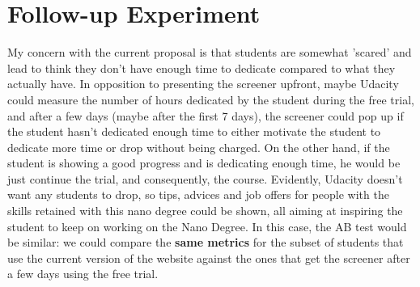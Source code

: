 \documentclass[11pt]{article}
\begin{document}
\section{Follow-up Experiment} \label{sec:followUpExperiments}

	My concern with the current proposal is that students are somewhat 'scared' and lead to think they don't have enough time to dedicate compared to what they actually have.
	In opposition to presenting the screener upfront, maybe Udacity could measure the number of hours dedicated by the student during the free trial, and after a few days (maybe after the first 7 days), the screener could pop up if the student hasn't dedicated enough time to either motivate the student to dedicate more time or drop without being charged.
	On the other hand, if the student is showing a good progress and is dedicating enough time, he would be just continue the trial, and consequently, the course.
	Evidently, Udacity doesn't want any students to drop, so tips, advices and job offers for people with the skills retained with this nano degree could be shown, all aiming at inspiring the student to keep on working on the Nano Degree.
	In this case, the AB test would be similar: we could compare the \textbf{same metrics} for the subset of students that use the current version of the website against the ones that get the screener after a few days using the free trial.
\end{document}
